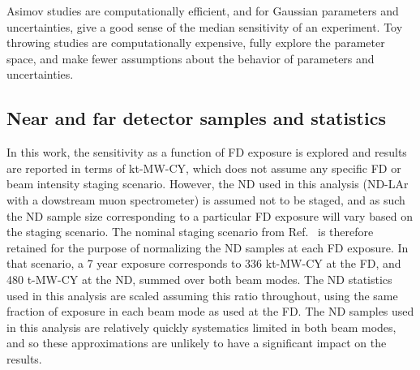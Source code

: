 Asimov studies are computationally efficient, and for Gaussian parameters and uncertainties, give a good sense of the median sensitivity of an experiment. Toy throwing studies are computationally expensive, fully explore the parameter space, and make fewer assumptions about the behavior of parameters and uncertainties.


\subsection{Near and far detector samples and statistics}
In this work, the sensitivity as a function of FD exposure is explored and results are reported in terms of kt-MW-CY, which does not assume any specific FD or beam intensity staging scenario. However, the ND used in this analysis (ND-LAr with a dowstream muon spectrometer) is assumed not to be staged, and as such the ND sample size corresponding to a particular FD exposure will vary based on the staging scenario. The nominal staging scenario from Ref.~\cite{Abi:2020qib} is therefore retained for the purpose of normalizing the ND samples at each FD exposure. In that scenario, a 7 year exposure corresponds to 336 kt-MW-CY at the FD, and 480 t-MW-CY at the ND, summed over both beam modes. The ND statistics used in this analysis are scaled assuming this ratio throughout, using the same fraction of exposure in each beam mode as used at the FD. The ND samples used in this analysis are relatively quickly systematics limited in both beam modes, and so these approximations are unlikely to have a significant impact on the results.

